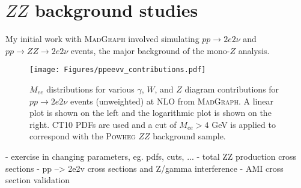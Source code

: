 \section{$ZZ$ background studies}
\label{sec:zzbackground}

My initial work with \textsc{MadGraph} involved simulating $pp \rightarrow 2e2\nu$ and $pp \rightarrow ZZ \rightarrow 2e2\nu$ events, the major background of the mono-$Z$ analysis.

\begin{figure}[h]
\centering
\texttt{[image: Figures/ppeevv\_contributions.pdf]}
\caption{$M_{ee}$ distributions for various $\gamma$, $W$, and $Z$ diagram contributions for $pp \rightarrow 2e2\nu$ events (unweighted) at NLO from \textsc{MadGraph}. A linear plot is shown on the left and the logarithmic plot is shown on the right. CT10 PDFs are used and a cut of $M_{ee} > 4$ GeV is applied to correspond with the \textsc{Powheg} $ZZ$ background sample.}
\label{fig:ppeevv_contributions}
\end{figure}

- exercise in changing parameters, eg. pdfs, cuts, ...
- total ZZ production cross sections
- pp --> 2e2v cross sections and Z/gamma interference
- AMI cross section validation